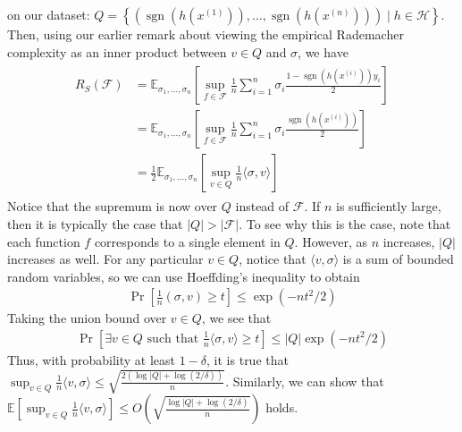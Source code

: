 \documentclass{article}
\begin{document}
on our dataset: $Q=\left\{\left(\operatorname{sgn}\left(h\left(x^{(1)}\right)\right), \ldots, \operatorname{sgn}\left(h\left(x^{(n)}\right)\right)\right) \mid h \in \mathcal{H}\right\} .$ Then, using our earlier remark about viewing the empirical Rademacher complexity as an inner product between $v \in Q$ and $\sigma$, we have
\begin{align*}
\begin{aligned}
R_{S}(\mathcal{F}) &=\mathbb{E}_{\sigma_{1}, \ldots, \sigma_{n}}\left[\sup _{f \in \mathcal{F}} \frac{1}{n} \sum_{i=1}^{n} \sigma_{i} \frac{1-\operatorname{sgn}\left(h\left(x^{(i)}\right)\right) y_{i}}{2}\right] \\
&=\mathbb{E}_{\sigma_{1}, \ldots, \sigma_{n}}\left[\sup _{f \in \mathcal{F}} \frac{1}{n} \sum_{i=1}^{n} \sigma_{i} \frac{\operatorname{sgn}\left(h\left(x^{(i)}\right)\right)}{2}\right] \\
&=\frac{1}{2} \mathbb{E}_{\sigma_{1}, \ldots, \sigma_{n}}\left[\sup _{v \in Q} \frac{1}{n}\langle\sigma, v\rangle\right]
\end{aligned}
\end{align*}
Notice that the supremum is now over $Q$ instead of $\mathcal{F} .$ If $n$ is sufficiently large, then it is typically the case that $|Q|>|\mathcal{F}| .$ To see why this is the case, note that each function $f$ corresponds to a single element in $Q .$ However, as $n$ increases, $|Q|$ increases as well. For any particular $v \in Q$, notice that $\langle v, \sigma\rangle$ is a sum of bounded random variables, so we can use Hoeffding's inequality to obtain
\begin{align*}
\operatorname{Pr}\left[\frac{1}{n}(\sigma, v) \geq t\right] \leq \exp \left(-n t^{2} / 2\right)
\end{align*}
Taking the union bound over $v \in Q$, we see that
\begin{align*}
\operatorname{Pr}\left[\exists v \in Q \text { such that } \frac{1}{n}\langle\sigma, v\rangle \geq t\right] \leq|Q| \exp \left(-n t^{2} / 2\right)
\end{align*}
Thus, with probability at least $1-\delta$, it is true that $\sup _{v \in Q} \frac{1}{n}\langle v, \sigma\rangle \leq \sqrt{\frac{2(\log |Q|+\log (2 / \delta))}{n}}$. Similarly, we can show that $\mathbb{E}\left[\sup _{v \in Q} \frac{1}{n}\langle v, \sigma\rangle\right] \leq O\left(\sqrt{\frac{\log |Q|+\log (2 / \delta)}{n}}\right)$ holds.
\end{document}
